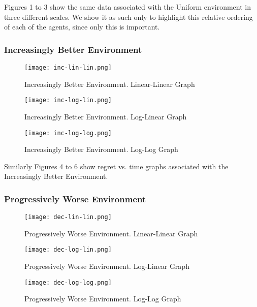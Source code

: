 Figures 1 to 3 show the same data associated with the Uniform environment in three different scales. We show it as such only to highlight this relative ordering of each of the agents, since only this is important.

\subsubsection{Increasingly Better Environment}

\begin{figure}[ht]
    \centering
    \texttt{[image: inc-lin-lin.png]}
    \caption{Increasingly Better Environment. Linear-Linear Graph}
    \label{fig:i1}
\end{figure}

\begin{figure}[ht]
    \centering
    \texttt{[image: inc-log-lin.png]}
    \caption{Increasingly Better Environment. Log-Linear Graph}
    \label{fig:i2}
\end{figure}

\begin{figure}[ht]
    \centering
    \texttt{[image: inc-log-log.png]}
    \caption{Increasingly Better Environment. Log-Log Graph}
    \label{fig:i3}
\end{figure}

Similarly Figures 4 to 6 show regret vs. time graphs associated with the Increasingly Better Environment. 

\subsubsection{Progressively Worse Environment}

\begin{figure}[ht]
    \centering
    \texttt{[image: dec-lin-lin.png]}
    \caption{Progressively Worse Environment. Linear-Linear Graph}
    \label{fig:d1}
\end{figure}

\begin{figure}[ht]
    \centering
    \texttt{[image: dec-log-lin.png]}
    \caption{Progressively Worse Environment. Log-Linear Graph}
    \label{fig:d2}
\end{figure}

\begin{figure}[ht]
    \centering
    \texttt{[image: dec-log-log.png]}
    \caption{Progressively Worse Environment. Log-Log Graph}
    \label{fig:d3}
\end{figure}

